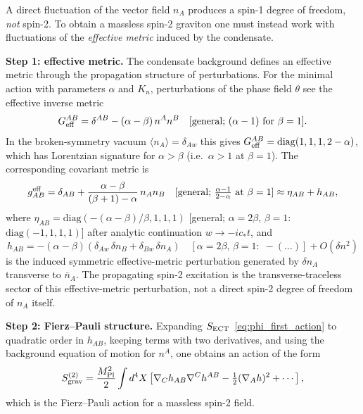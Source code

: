 \documentclass[11pt,a4paper]{article}
\numberwithin{equation}{section}
\begin{document}
A direct fluctuation of the vector field $n_A$ produces a spin-1
degree of freedom, \emph{not} spin-2.  To obtain a massless spin-2
graviton one must instead work with fluctuations of the
\emph{effective metric} induced by the condensate.

\textbf{Step 1: effective metric.}
The condensate background defines an effective metric through the
propagation structure of perturbations.  For the minimal action
with parameters $\alpha$ and $K_n$, perturbations of the phase
field $\theta$ see the effective inverse metric
\begin{equation}
\label{eq:geff}
G^{AB}_{\rm eff} = \delta^{AB} - (\alpha-\beta)\,n^A n^B
\quad[\text{general; }(\alpha-1)\text{ for }\beta=1].
\end{equation}
In the broken-symmetry vacuum $\langle n_A\rangle=\delta_{Aw}$ this
gives $G^{AB}_{\rm eff}=\mathrm{diag}(1,1,1,2-\alpha)$, which has
Lorentzian signature for $\alpha>\beta$ (i.e.\ $\alpha>1$ at $\beta=1$).  The corresponding covariant
metric is
\begin{equation}
\label{eq:geff_cov_legacy}
g^{\rm eff}_{AB} = \delta_{AB}
+ \frac{\alpha-\beta}{(\beta+1)-\alpha}\,n_A n_B\quad[\text{general; }\tfrac{\alpha-1}{2-\alpha}\text{ at }\beta=1]
\approx \eta_{AB} + h_{AB},
\end{equation}
where $\eta_{AB}=\mathrm{diag}(-(\alpha-\beta)/\beta,1,1,1)$ [general; $\alpha=2\beta$, $\beta=1$: $\mathrm{diag}(-1,1,1,1)$] after analytic
continuation $w\to-ic_*t$, and
\begin{equation}
\label{eq:graviton_field}
h_{AB}
= -(\alpha-\beta)\!\left(\delta_{Aw}\,\delta n_B + \delta_{Bw}\,\delta n_A\right)\quad[\alpha=2\beta,\,\beta=1:\; -(\ldots)]
+ O(\delta n^2)
\end{equation}
is the induced symmetric effective-metric perturbation generated by
$\delta n_A$ transverse to $\bar n_A$.
The propagating spin-2 excitation is the transverse-traceless sector
of this effective-metric perturbation, not a direct spin-2 degree of freedom of $n_A$ itself.

\textbf{Step 2: Fierz--Pauli structure.}
Expanding $S_{\rm ECT}$~\eqref{eq:phi_first_action} to quadratic order
in $h_{AB}$, keeping terms with two derivatives, and using the
background equation of motion for $n^A$, one obtains an action
of the form
\begin{equation}
\label{eq:FP_action_legacy}
S^{(2)}_{\rm grav}
= \frac{M_{\rm Pl}^2}{2}
\int d^4X\left[
\nabla_C h_{AB}\nabla^C h^{AB}
- \tfrac{1}{2}(\nabla_A h)^2
+ \cdots
\right],
\end{equation}
which is the Fierz--Pauli action for a massless spin-2 field.
\end{document}
